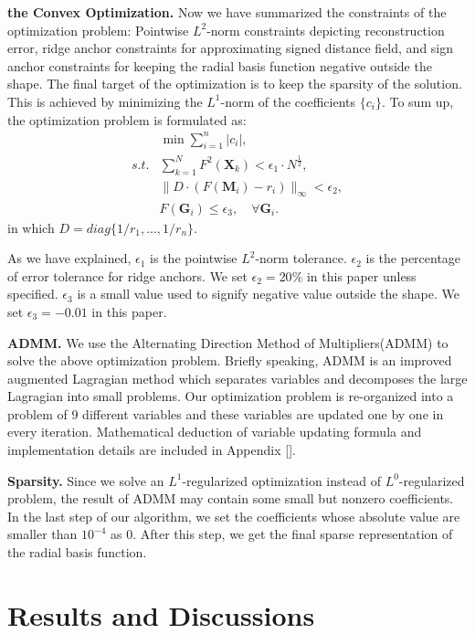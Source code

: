 \documentclass[annual]{acmsiggraph}
\begin{document}
\textbf{the Convex Optimization. } Now we have summarized the constraints of the optimization problem: Pointwise $L^2$-norm constraints depicting reconstruction error, ridge anchor constraints for approximating signed distance field, and sign anchor constraints for keeping the radial basis function negative outside the shape. The final target of the optimization is to keep the sparsity of the solution. This is achieved by minimizing the $L^1$-norm of the coefficients $\{c_i\}$. To sum up, the optimization problem is formulated as:
\begin{align}
&\min\sum_{i=1}^n|c_i|,\label{eq:1}\\
s.t. &\sum_{k=1}^N F^2(\mathbf{X}_k)<\epsilon_1\cdot N^{\frac{1}{2}},\label{eq:2}\\
&\|D\cdot(F(\mathbf{M}_i)-r_i)\|_{\infty}<\epsilon_2,\label{eq:3}\\
& F(\mathbf{G}_i) \le \epsilon_3, \quad\forall \mathbf{G}_i.\label{eq:4}
\end{align}
in which $D=diag\{1/r_1,...,1/r_n\}$.

As we have explained, $\epsilon_1$ is the pointwise $L^2$-norm tolerance. $\epsilon_2$ is the percentage of error tolerance for ridge anchors. We set $\epsilon_2=20\%$ in this paper unless specified. $\epsilon_3$ is a small value used to signify negative value outside the shape. We set $\epsilon_3=-0.01$ in this paper.

\textbf{ADMM. }
We use the Alternating Direction Method of Multipliers(ADMM) to solve the above optimization problem. Briefly speaking, ADMM is an improved augmented Lagragian method which separates variables and decomposes the large Lagragian into small problems. Our optimization problem is re-organized into a problem of 9 different variables and these variables are updated one by one in every iteration. Mathematical deduction of variable updating formula and implementation details are included in Appendix [].

\textbf{Sparsity. }
Since we solve an $L^1$-regularized optimization instead of $L^0$-regularized problem, the result of ADMM may contain some small but nonzero coefficients. In the last step of our algorithm, we set the coefficients whose absolute value are smaller than $10^{-4}$ as 0. After this step, we get the final sparse representation of the radial basis function.

\section{Results and Discussions}
~\cite{Chen:2009:ABF}
\end{document}
